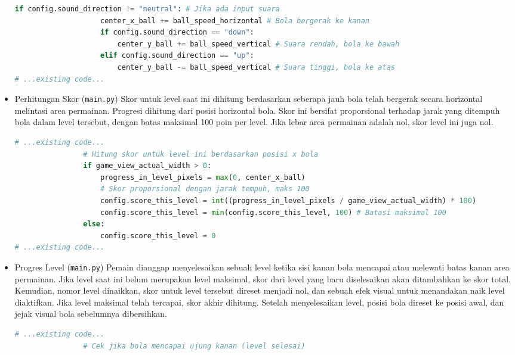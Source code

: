 \documentclass[11pt,a4paper]{article}
\begin{document}
\begin{itemize}
\begin{lstlisting}[language=Python, caption=Logika pergerakan bola]
                if config.sound_direction != "neutral": # Jika ada input suara
                    center_x_ball += ball_speed_horizontal # Bola bergerak ke kanan
                    if config.sound_direction == "down": 
                        center_y_ball += ball_speed_vertical # Suara rendah, bola ke bawah
                    elif config.sound_direction == "up": 
                        center_y_ball -= ball_speed_vertical # Suara tinggi, bola ke atas
# ...existing code...
\end{lstlisting}
\item Perhitungan Skor (\texttt{main.py})
\newline Skor untuk level saat ini dihitung berdasarkan seberapa jauh bola telah bergerak secara horizontal melintasi area permainan. Progresi dihitung dari posisi horizontal bola. Skor ini bersifat proporsional terhadap jarak yang ditempuh bola dalam level tersebut, dengan batas maksimal 100 poin per level. Jika lebar area permainan adalah nol, skor level ini juga nol.
\begin{lstlisting}[language=Python, caption=Logika perhitungan skor]
# ...existing code...
                # Hitung skor untuk level ini berdasarkan posisi x bola
                if game_view_actual_width > 0:
                    progress_in_level_pixels = max(0, center_x_ball) 
                    # Skor proporsional dengan jarak tempuh, maks 100
                    config.score_this_level = int((progress_in_level_pixels / game_view_actual_width) * 100)
                    config.score_this_level = min(config.score_this_level, 100) # Batasi maksimal 100
                else:
                    config.score_this_level = 0
# ...existing code...
\end{lstlisting}
\item Progres Level (\texttt{main.py})
\newline Pemain dianggap menyelesaikan sebuah level ketika sisi kanan bola mencapai atau melewati batas kanan area permainan. Jika level saat ini belum merupakan level maksimal, skor dari level yang baru diselesaikan akan ditambahkan ke skor total. Kemudian, nomor level dinaikkan, skor untuk level tersebut direset menjadi nol, dan sebuah efek visual untuk menandakan naik level diaktifkan. Jika level maksimal telah tercapai, skor akhir dihitung. Setelah menyelesaikan level, posisi bola direset ke posisi awal, dan jejak visual bola sebelumnya dibersihkan.
\begin{lstlisting}[language=Python, caption=Logika progres level]
# ...existing code...
                # Cek jika bola mencapai ujung kanan (level selesai)

\end{lstlisting}
\end{itemize}
\end{document}
